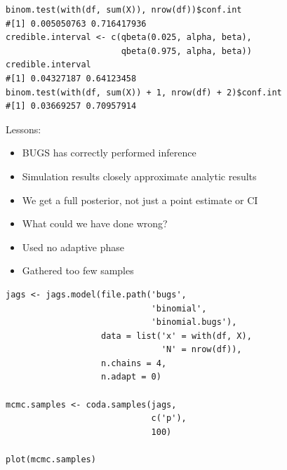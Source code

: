 \documentclass{beamer}
\begin{document}
\begin{frame}[fragile]
  \begin{verbatim}
binom.test(with(df, sum(X)), nrow(df))$conf.int
#[1] 0.005050763 0.716417936
credible.interval <- c(qbeta(0.025, alpha, beta),
                       qbeta(0.975, alpha, beta))
credible.interval
#[1] 0.04327187 0.64123458
binom.test(with(df, sum(X)) + 1, nrow(df) + 2)$conf.int
#[1] 0.03669257 0.70957914
  \end{verbatim}
\end{frame}

\begin{frame}[fragile]
  Lessons:
  
  \begin{itemize}
    \item{BUGS has correctly performed inference}
    \item{Simulation results closely approximate analytic results}
    \item{We get a full posterior, not just a point estimate or CI}
  \end{itemize}
\end{frame}

\begin{frame}[fragile]
  \begin{itemize}
    \item{What could we have done wrong?}
    \item{Used no adaptive phase}
    \item{Gathered too few samples}
  \end{itemize}
\end{frame}

\begin{frame}[fragile]
  \begin{verbatim}
jags <- jags.model(file.path('bugs',
                             'binomial',
                             'binomial.bugs'),
                   data = list('x' = with(df, X),
                               'N' = nrow(df)),
                   n.chains = 4,
                   n.adapt = 0)
                   
mcmc.samples <- coda.samples(jags,
                             c('p'),
                             100)

plot(mcmc.samples)
  \end{verbatim}
\end{frame}
\end{document}
